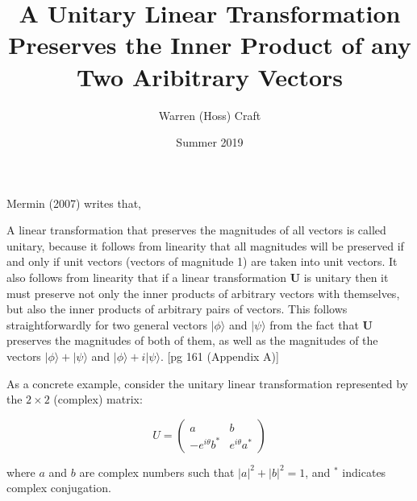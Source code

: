 \documentclass{article}
\title{A Unitary Linear Transformation Preserves the Inner Product of any Two Aribitrary Vectors}
\author{Warren (Hoss) Craft}
\date{Summer 2019}
\begin{document}
\maketitle

\flushleft


Mermin (2007) writes that,
\vspace{0.125in}
\begin{addmargin}[0.25in]{0.25in}
A linear transformation that preserves the magnitudes of all vectors is called unitary, because it follows from linearity that all magnitudes will be preserved if and only if unit vectors (vectors of magnitude 1) are taken into unit vectors. It also follows from linearity that if a linear transformation \textbf{U} is unitary then it must preserve not only the inner products of arbitrary vectors with themselves, but also the inner products of arbitrary pairs of vectors. This follows straightforwardly for two general vectors $|\phi\rangle$ and $|\psi\rangle$ from the fact that \textbf{U} preserves the magnitudes of both of them, as well as the magnitudes of the vectors $|\phi\rangle + |\psi\rangle$ and $|\phi\rangle + i|\psi\rangle$. [pg 161 (Appendix A)]
\end{addmargin}

\vspace{0.125in}

As a concrete example, consider the unitary linear transformation represented by the $2 \times 2$ (complex) matrix:

\[
U = \begin{pmatrix}
a & b\\ -e^{i\theta}b^{*} & e^{i\theta}a^{*}
\end{pmatrix}
\]

where $a$ and $b$ are complex numbers such that $|a|^2 + |b|^2 = 1$, and $^*$ indicates complex conjugation.

\vspace{0.125in}
\end{document}
